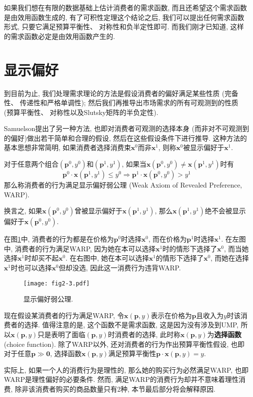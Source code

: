 \documentclass[cn, 12pt, math=mtpro2, bibstyle=apa, blue]{elegantbook}
\newcommand{\p}{\mathbf{p}}
\newcommand{\x}{\mathbf{x}}
\begin{document}
如果我们想在有限的数据基础上估计消费者的需求函数, 而且还希望这个需求函数是由效用函数生成的, 有了可积性定理这个结论之后, 我们可以提出任何需求函数形式, 只要它满足预算平衡性、 对称性和负半定性即可. 而我们刚才已知道, 这样的需求函数必定是由效用函数产生的.
\section{显示偏好}
到目前为止, 我们处理需求理论的方法是假设消费者的偏好满足某些性质 (完备性、 传递性和严格单调性); 然后我们再推导出市场需求的所有可观测到的性质 (预算平衡性、 对称性以及Slutsky矩阵的半负定性).

Samuelson提出了另一种方法, 也即对消费者可观测的选择本身 (而非对不可观测到的偏好)做出若干简单和合理的假设, 然后在这些假设条件下进行推导. 这种方法的基本思想非常简明, 如果消费者选择消费束$\x^0$而非$\x^1$, 则称$\x^0$被显示偏好于$\x^1$.

\begin{definition}
对于任意两个组合$(\p^0,y^0)$和$(\p^1,y^1)$, 如果当$\x(\p^0,y^0)\neq \x(\p^1,y^1)$时有
$$\p^0\cdot\x(\p^1,y^1)\leq y^0\Rightarrow\p^1\cdot\x(\p^0,y^0)>y^1$$
那么称消费者的行为满足显示偏好弱公理 (Weak Axiom of Revealed Preference, WARP).
\end{definition}
换言之, 如果$\x(\p^0,y^0)$曾被显示偏好于$\x(\p^1,y^1)$, 那么$\x(\p^1,y^1)$绝不会被显示偏好于$\x(\p^0,y^0)$.

在图\ref{fig2.3}中, 消费者的行为都是在价格为$\p^0$时选择$\x^0$, 而在价格为$\p^1$时选择$\x^1$. 在左图中, 消费者的行为满足WARP, 因为她在本可以选择$\x^1$时的情形下选择了$\x^0$, 而当她选择$\x^1$时却买不起$\x^0$. 在右图中, 她在本可以选择$\x^1$的情形下选择了$\x^0$, 而她在选择$\x^1$时也可以选择$\x^0$但却没选, 因此这一消费行为违背WARP.

\begin{figure}[htbp!]
  \centering
  \texttt{[image: fig2-3.pdf]}
  \caption{显示偏好弱公理.}\label{fig2.3}
\end{figure}

现在假设某消费者的行为满足WARP, 令$\x(\p,y)$表示在价格为$\p$且收入为$y$时该消费者的选择. 值得注意的是, 这个函数不是需求函数, 这是因为没有涉及到UMP, 所以$\x(\p,y)$只是表明了面临$(\p,y)$时消费者的选择, 此时称$\x(\p,y)$为\textbf{选择函数} (choice function). 除了WARP以外, 还对消费者的行为作出预算平衡性假设, 也即对于任意$\p\gg\mathbf{0}$, 选择函数$\x(\p,y)$满足预算平衡性$\p\cdot\x(\p,y)=y$.

实际上, 如果一个人的消费行为是理性的, 那么她的购买行为必然满足WARP, 也即WARP是理性偏好的必要条件. 然而, 满足WARP的消费行为却并不意味着理性消费, 除非该消费者购买的商品数量只有2种, 本节最后部分将会解释原因.
\end{document}
